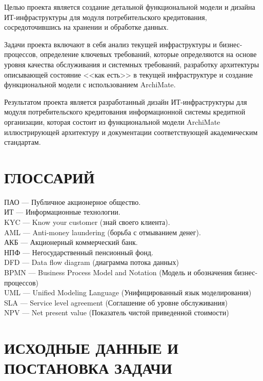\documentclass[14pt, a4paper]{extarticle}
\begin{document}
Целью проекта является создание детальной функциональной модели и
дизайна ИТ-инфраструктуры для модуля потребительского кредитования,
сосредоточившись на хранении и обработке данных.

Задачи проекта включают в себя анализ текущей инфраструктуры и
бизнес-процессов, определение ключевых требований, которые определяются на
основе уровня качества обслуживания и системных требований, разработку
архитектуры описывающей состояние <<как есть>> в текущей инфраструктуре и
создание функциональной модели с использованием ArchiMate.

Результатом проекта является разработанный дизайн ИТ-инфраструктуры для
модуля потребительского кредитования информационной системы кредитной
организации, которая состоит из функциональной модели ArchiMate иллюстрирующей
архитектуру и документации соответствующей академическим стандартам.

\section*{ГЛОССАРИЙ}
{}
\begin{raggedright}
	ПАО --- Публичное акционерное общество. \\
	ИТ --- Информационные технологии. \\
	KYC --- Know your customer (знай своего клиента). \\
	AML --- Anti-money laundering (борьба с отмыванием денег). \\
	АКБ --- Акционерный коммерческий банк. \\
	НПФ --- Негосударственный пенсионный фонд. \\
	DFD --- Data flow diagram (диаграмма потока данных) \\
	BPMN --- Business Process Model and Notation (Модель и обозначения
	бизнес-процессов) \\
	UML --- Unified Modeling Language (Унифицированный язык моделирования) \\
	SLA --- Service level agreement (Соглашение об уровне обслуживания) \\
	NPV --- Net present value (Показатель чистой приведенной стоимости) \\
\end{raggedright}

\section{ИСХОДНЫЕ ДАННЫЕ И ПОСТАНОВКА ЗАДАЧИ}
\end{document}
